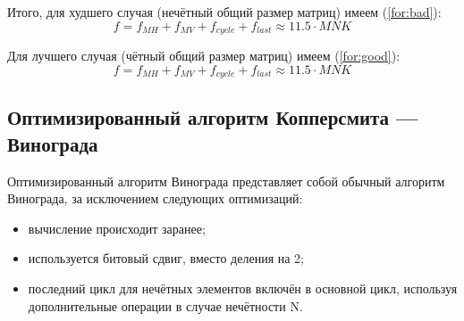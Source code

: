 Итого, для худшего случая (нечётный общий размер матриц) имеем (\ref{for:bad}):
\begin{equation}
	\label{for:bad}
	f =  f_{MH} + f_{MV} + f_{cycle} + f_{last}\approx 11.5 \cdot MNK
\end{equation}

Для лучшего случая (чётный общий размер матриц) имеем (\ref{for:good}):
\begin{equation}
	\label{for:good}
f =  f_{MH} + f_{MV} + f_{cycle} + f_{last} \approx 11.5 \cdot MNK
\end{equation}


\subsection{Оптимизированный алгоритм Копперсмита — Винограда}

Оптимизированный алгоритм Винограда представляет собой обычный алгоритм Винограда, за исключением следующих оптимизаций:
\begin{itemize}
	\item вычисление происходит заранее;
	\item используется битовый сдвиг, вместо деления на 2;
	\item последний цикл для нечётных элементов включён в основной цикл,
	используя дополнительные операции в случае нечётности N.
\end{itemize}


